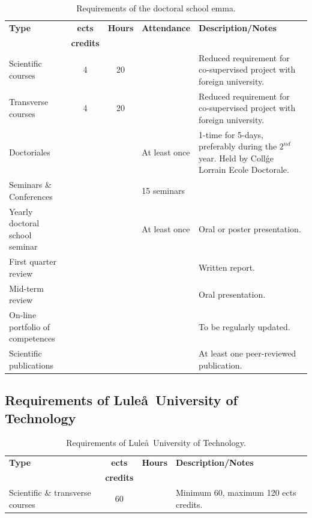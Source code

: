 \documentclass[a4paper, twoside,12pt, abstract]{scrartcl} %
\begin{document}
\begin{table}[h!]
  \centering
  \small
  \caption[Requirements of the doctoral school \acrfull{emma}.]{Requirements of the doctoral school \acrfull{emma}.\\[5pt]}
    \begin{tabularx}{\textwidth}{p{}ccXp{}}
    \toprule
  \textbf{Type} & \textbf{\acrshort{ects}}&\textbf{Hours}&\textbf{Attendance}&\textbf{Description/Notes} \\
  & \textbf{credits}&&&\\
    \midrule
   Scientific courses&4&20&&Reduced requirement for co-supervised project with foreign university.\\
   Transverse courses&4&20&&Reduced requirement for co-supervised project with foreign university.\\
   Doctoriales&&&At least once&1-time for 5-days, preferably during the $2^{nd}$ year. Held by Coll\'ge Lorrain Ecole Doctorale.\\
   Seminars \& Conferences&&&15 seminars&\\
   Yearly doctoral school seminar&&&At least once&Oral or poster presentation.\\
   First quarter review&&&& Written report.\\
   Mid-term review&&&&Oral presentation.\\
   On-line portfolio of competences&&&&To be regularly updated.\\
   Scientific publications&&&&At least one peer-reviewed publication.\\
    \bottomrule
    \end{tabularx}%
  \label{tab:emma_tab}%
\end{table}%

\newpage

\subsection{Requirements of Lule\aa\ University of Technology}

\begin{table}[h!]
  \centering
  \small
  \caption[Requirements of Lule\aa\ University of Technology.]{Requirements of Lule\aa\ University of Technology.\\[10pt]}
    \begin{tabularx}{\textwidth}{p{}ccX}
    \toprule
  \textbf{Type} & \textbf{\acrshort{ects}}&\textbf{Hours}&\textbf{Description/Notes} \\
  & \textbf{credits}&&\\
    \midrule
   Scientific \& transverse courses&60&&Minimum 60, maximum 120 \acrshort{ects} credits.\\
    \bottomrule
    \end{tabularx}%
  \label{tab:lulea_tab}%
\end{table}%
\end{document}
